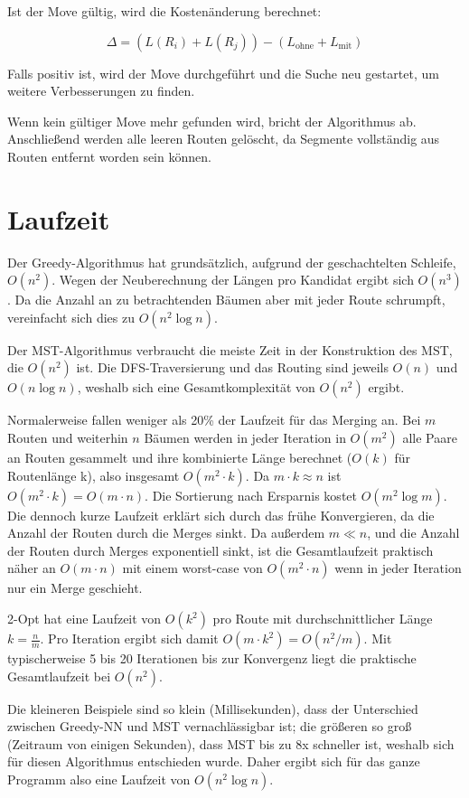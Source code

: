 \documentclass[a4paper,10pt,ngerman]{scrartcl}
\begin{document}
    Ist der Move gültig, wird die Kostenänderung berechnet:

    \[
        \Delta = (L(R_i) + L(R_j)) - (L_{\text{ohne}} + L_{\text{mit}})
    \]

    Falls \Delta positiv ist, wird der Move durchgeführt und die Suche neu gestartet, um weitere Verbesserungen zu
    finden.

    Wenn kein gültiger Move mehr gefunden wird, bricht der Algorithmus ab. Anschließend
    werden alle leeren Routen gelöscht, da Segmente vollständig aus Routen entfernt worden sein können.

    \section{Laufzeit}
    Der Greedy-Algorithmus hat grundsätzlich, aufgrund der geschachtelten Schleife, $O(n^2)$. Wegen der Neuberechnung
    der Längen pro Kandidat ergibt sich $O(n^3)$. Da die Anzahl an zu betrachtenden Bäumen aber mit jeder Route
    schrumpft, vereinfacht sich dies zu $O(n^2 \log n)$.

    Der MST-Algorithmus verbraucht die meiste Zeit in der Konstruktion des MST, die $O(n^2)$ ist. Die DFS-Traversierung
    und das Routing sind jeweils $O(n)$ und $O(n \log n)$, weshalb sich eine Gesamtkomplexität von $O(n^2)$ ergibt.

    Normalerweise fallen weniger als 20\% der Laufzeit für das Merging an. Bei $m$ Routen und weiterhin $n$ Bäumen
    werden in jeder Iteration in $O(m^2)$ alle Paare an Routen gesammelt und ihre kombinierte Länge berechnet ($O(k)$
    für Routenlänge k), also insgesamt $O(m^2 \cdot k)$. Da $m \cdot k \approx n$ ist $O(m^2 \cdot k) = O(m \cdot n)$.
    Die Sortierung nach Ersparnis kostet $O(m^2 \log m)$. Die dennoch kurze Laufzeit erklärt sich durch das frühe
    Konvergieren, da die Anzahl der Routen durch die Merges sinkt. Da außerdem $m \ll n$, und die Anzahl der Routen
    durch Merges exponentiell sinkt, ist die Gesamtlaufzeit praktisch näher an $O(m \cdot n)$ mit einem worst-case von
    $O(m^2 \cdot n)$ wenn in jeder Iteration nur ein Merge geschieht.

    2-Opt hat eine Laufzeit von $O(k^2)$ pro Route mit durchschnittlicher Länge $k = \frac n m$. Pro Iteration ergibt
    sich damit $O(m \cdot k^2) = O(n^2/m)$. Mit typischerweise 5 bis 20 Iterationen bis zur Konvergenz liegt die
    praktische Gesamtlaufzeit bei $O(n^2)$.

    Die kleineren Beispiele sind so klein (Millisekunden), dass der Unterschied zwischen Greedy-NN und MST
    vernachlässigbar ist; die größeren so groß (Zeitraum von einigen Sekunden), dass MST bis zu 8x schneller ist,
    weshalb sich für diesen Algorithmus entschieden wurde.
    Daher ergibt sich für das ganze Programm also eine Laufzeit von $O(n^2 \log n)$.
\end{document}
